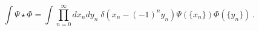\begin{equation}
\int \Psi \star \Phi = \int \prod_{n = 0}^{ \infty}  dx_ndy_n
\; \delta (x_n-(-1)^ny_n) \Psi (\{x_n\}) \Phi (\{y_n\})\,.
\end{equation}

